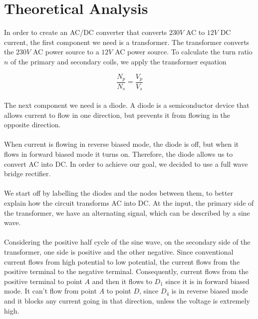 \section{Theoretical Analysis}  \label{sec:analysis}

In order to create an AC/DC converter that converts $230V$ AC to $12V$ DC current,
the first component we need is a transformer. The transformer converts the $230V$ AC
power source to a $12V$ AC power source. To calculate the turn ratio $n$ of the primary
and secondary coils,
we apply the transformer equation

\begin{equation}
    \frac{N_p}{N_s} = \frac{V_p}{V_s}
    \label{transformador}
\end{equation}

\paragraph{} The next component we need is a diode.
A diode is a semiconductor device that allows current to flow in one direction, but prevents it
from flowing in the opposite direction.
\paragraph{} When current is flowing in reverse biased mode, the diode is
off, but when it flows in forward biased mode it turns on. Therefore, the diode allows us to convert
AC into DC. In order to achieve our goal, we decided to use a full wave bridge rectifier.

\paragraph{} We start off by labelling the diodes and the nodes between them, to better explain how
the circuit transforms AC into DC. At the input, the primary side of the transformer, we have an alternating signal, which can be described by a sine wave.
\paragraph{}Considering the positive half
cycle
of the sine wave, on the secondary side of the transformer, one side  is positive and the other negative.
Since conventional current flows from high potential to low potential, the current flows from  the
positive terminal to the negative terminal. Consequently, current flows from the positive terminal
to point $A$ and then it flows to $D_1$ since it is in forward biased mode. It can't flow from point
$A$ to point $D$, since $D_4$ is in reverse biased mode and it blocks any current going in that
direction, unless the voltage is extremely high.
